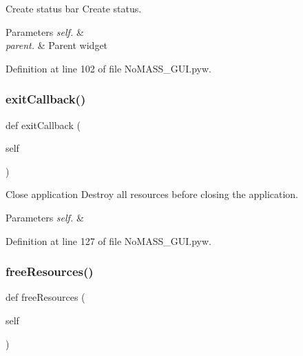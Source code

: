Create status bar Create status. 


\begin{DoxyParams}{Parameters}
{\em self.} & \\
\hline
{\em parent.} & Parent widget \\
\hline
\end{DoxyParams}


Definition at line 102 of file No\+M\+A\+S\+S\+\_\+\+G\+U\+I.\+pyw.

\mbox{\label{class_no_m_a_s_s___g_u_i_1_1_app_a49c1ac8804dc14c695793e23549756d7}} 
\subsubsection{\texorpdfstring{exit\+Callback()}{exitCallback()}}
{\footnotesize\ttfamily def exit\+Callback (\begin{DoxyParamCaption}\item[{}]{self }\end{DoxyParamCaption})}



Close application Destroy all resources before closing the application. 


\begin{DoxyParams}{Parameters}
{\em self.} & \\
\hline
\end{DoxyParams}


Definition at line 127 of file No\+M\+A\+S\+S\+\_\+\+G\+U\+I.\+pyw.

\mbox{\label{class_no_m_a_s_s___g_u_i_1_1_app_a3fbca20a2bdf6d712baf7816a11c3585}} 
\subsubsection{\texorpdfstring{free\+Resources()}{freeResources()}}
{\footnotesize\ttfamily def free\+Resources (\begin{DoxyParamCaption}\item[{}]{self }\end{DoxyParamCaption})}



